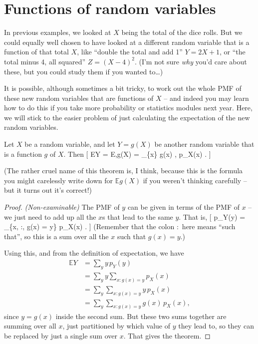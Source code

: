 \documentclass[
  letterpaper,
]{report}
\theoremstyle{definition}
\theoremstyle{definition}
\theoremstyle{remark}
\begin{document}
\hypertarget{functions}{%
\section{Functions of random variables}\label{functions}}

In previous examples, we looked at \(X\) being the total of the dice
rolls. But we could equally well chosen to have looked at a different
random variable that is a function of that total \(X\), like ``double
the total and add 1'' \(Y = 2X + 1\), or ``the total minus 4, all
squared'' \(Z = (X-4)^2\). (I'm not sure \emph{why} you'd care about
these, but you could study them if you wanted to\ldots)

It is possible, although sometimes a bit tricky, to work out the whole
PMF of these new random variables that are functions of \(X\) -- and
indeed you may learn how to do this if you take more probability or
statistics modules next year. Here, we will stick to the easier problem
of just calculating the expectation of the new random variables.

\leavevmode{}%
Let \(X\) be a random variable, and let \(Y = g(X)\) be another random
variable that is a function \(g\) of \(X\). Then {[} \mathbb EY =
\mathbb E,g(X) = \sum\_\{x\} g(x) , p\_X(x) . {]}

(The rather cruel name of this theorem is, I think, because this is the
formula you might carelessly write down for \(\mathbb Eg(X)\) if you
weren't thinking carefully -- but it turns out it's correct!)

\begin{proof}

\emph{(Non-examinable)} The PMF of \(y\) can be given in terms of the
PMF of \(x\) -- we just need to add up all the \(x\)s that lead to the
same \(y\). That is, {[} p\_Y(y) = \sum\_\{x, :, g(x) = y\} p\_X(x) .
{]} (Remember that the colon \(:\) here means ``such that'', so this is
a sum over all the \(x\) such that \(g(x) = y\).)

Using this, and from the definition of expectation, we have
\begin{align*}
  \mathbb EY &= \sum_y y \, p_Y(y) \\
    &= \sum_y y \sum_{x : g(x) = y} p_X(x) \\
    &= \sum_y \sum_{x : g(x) = y} y\,p_X(x) \\
    &= \sum_y \sum_{x : g(x) = y} g(x) \, p_X(x) ,
\end{align*} since \(y = g(x)\) inside the second sum. But these two
sums together are summing over all \(x\), just partitioned by which
value of \(y\) they lead to, so they can be replaced by just a single
sum over \(x\). That gives the theorem.

\end{proof}
\end{document}
